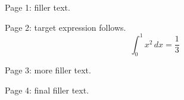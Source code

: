 \documentclass{article}
\begin{document}
Page 1: filler text.

\newpage

Page 2: target expression follows.
\[
\int_0^1 x^2\,dx = \frac{1}{3}
\]

\newpage

Page 3: more filler text.

\newpage

Page 4: final filler text.
\end{document}
